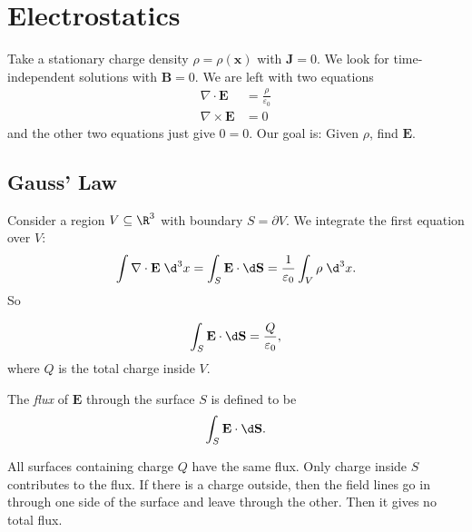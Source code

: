 \documentclass[a4paper]{article}
\begin{document}
\section{Electrostatics}
Take a stationary charge density $\rho = \rho(\mathbf{x})$ with $\mathbf{J} = 0$. We look for time-independent solutions with $\mathbf{B} = 0$. We are left with two equations
\begin{align*}
  \nabla \cdot \mathbf{E} &= \frac{\rho}{\varepsilon_0}\\
  \nabla\times \mathbf{E} &= 0
\end{align*}
and the other two equations just give $0 = 0$. Our goal is: Given $\rho$, find $\mathbf{E}$.
\subsection{Gauss' Law}
Consider a region $V\subseteq \R^3$ with boundary $S = \partial V$. We integrate the first equation over $V$:
\[
  \int \nabla\cdot \mathbf{E}\; \d^3 x = \int_S \mathbf{E}\cdot \d \mathbf{S} = \frac{1}{\varepsilon_0} \int_V \rho \;\d ^3 x.
\]
So
\begin{law}
  \[
    \int_S \mathbf{E}\cdot \d \mathbf{S} =\frac{Q}{\varepsilon_0},
  \]
  where $Q$ is the total charge inside $V$.
\end{law}
\begin{defi}
  The \emph{flux} of $\mathbf{E}$ through the surface $S$ is defined to be 
  \[
    \int_S \mathbf{E} \cdot\d \mathbf{S}.
  \]
\end{defi}

\note All surfaces containing charge $Q$ have the same flux. Only charge inside $S$ contributes to the flux. If there is a charge outside, then the field lines go in through one side of the surface and leave through the other. Then it gives no total flux.
\end{document}
